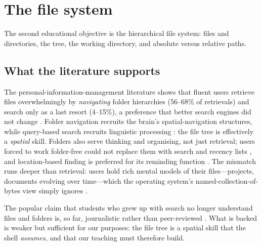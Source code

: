 \mode*
\section{The file system}
\label{sec:filesystem}

The second educational objective is the hierarchical file system: files and
directories, the tree, the working directory, and absolute versus relative
paths.

\subsection{What the literature supports}

The personal-information-management literature shows that fluent users
retrieve files overwhelmingly by \emph{navigating} folder hierarchies
(56--68\% of retrievals) and search only as a last resort (4--15\%), a
preference that better search engines did not change
\autocite{Bergman2008Navigation}.
Folder navigation recruits the brain's spatial-navigation structures, while
query-based search recruits linguistic processing
\autocite{Benn2015BrainFolders}: the file tree is effectively a
\emph{spatial} skill.
Folders also serve thinking and organising, not just retrieval; users
forced to work folder-free could not replace them with search and recency
lists \autocite{Whitham2017Folder}, and location-based finding is preferred
for its reminding function \autocite{BarreauNardi1995}.
The mismatch runs deeper than retrieval: users hold rich mental models of
their files---projects, documents evolving over time---which the operating
system's named-collection-of-bytes view simply ignores
\autocite{May2019FileLifecycle}.

The popular claim that students who grew up with search no longer
understand files and folders is, so far, journalistic rather than
peer-reviewed \autocite[flagged as anecdote]{Chin2021FileNotFound}.
What is backed is weaker but sufficient for our purposes: the file tree is
a spatial skill that the shell \emph{assumes}, and that our teaching must
therefore build.


